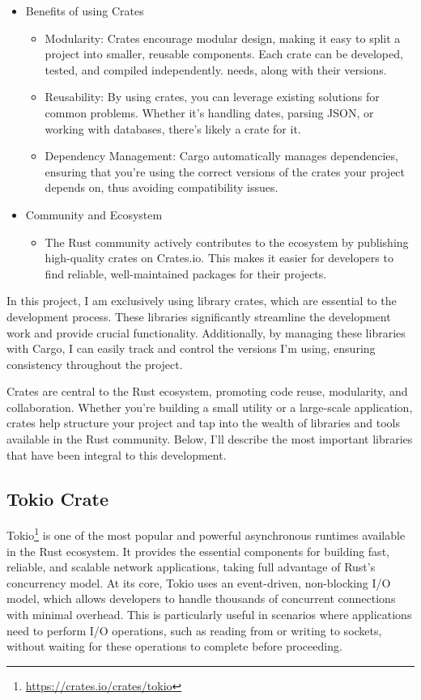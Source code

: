 \begin{itemize}
	\item Benefits of using Crates
	\begin{itemize}
		\item Modularity: Crates encourage modular design, making it easy to split a project into smaller, reusable components. Each crate can be developed, tested, and compiled independently. needs, along with their versions.
		\item Reusability: By using crates, you can leverage existing solutions for common problems. Whether it's handling dates, parsing JSON, or working with databases, there’s likely a crate for it.
		\item Dependency Management: Cargo automatically manages dependencies, ensuring that you’re using the correct versions of the crates your project depends on, thus avoiding compatibility issues.
	\end{itemize}
	
	\item Community and Ecosystem
	\begin{itemize}
		\item The Rust community actively contributes to the ecosystem by publishing high-quality crates on Crates.io. This makes it easier for developers to find reliable, well-maintained packages for their projects.
	\end{itemize}
\end{itemize}

In this project, I am exclusively using library crates, which are essential to the development process. These libraries significantly streamline the development work and provide crucial functionality. Additionally, by managing these libraries with Cargo, I can easily track and control the versions I’m using, ensuring consistency throughout the project.

Crates are central to the Rust ecosystem, promoting code reuse, modularity, and collaboration. Whether you’re building a small utility or a large-scale application, crates help structure your project and tap into the wealth of libraries and tools available in the Rust community. Below, I’ll describe the most important libraries that have been integral to this development.

\subsection{Tokio Crate}

Tokio\footnote{\url{https://crates.io/crates/tokio}} is one of the most popular and powerful asynchronous runtimes available in the Rust ecosystem. It provides the essential components for building fast, reliable, and scalable network applications, taking full advantage of Rust's concurrency model. At its core, Tokio uses an event-driven, non-blocking I/O model, which allows developers to handle thousands of concurrent connections with minimal overhead. This is particularly useful in scenarios where applications need to perform I/O operations, such as reading from or writing to sockets, without waiting for these operations to complete before proceeding.

